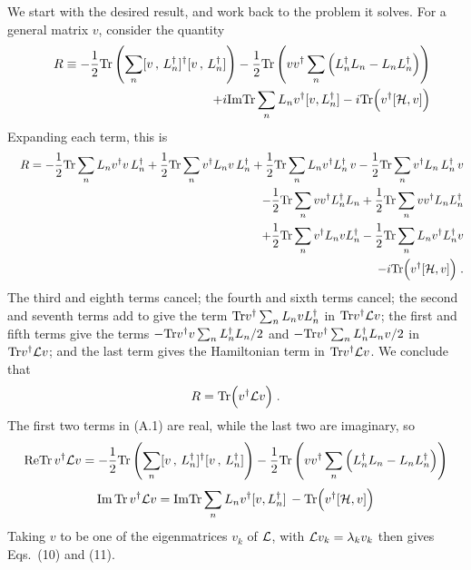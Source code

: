 \documentclass[12pt]{article}
\begin{document}
We start with the desired result, and work back to the problem it solves.  For a general matrix $v$, consider the quantity 
\begin{eqnarray}
&&R\equiv-\frac{1}{2}{\rm Tr}\left(\sum_n [v\,,\,L_n^\dagger]^\dagger[v\,,\,L_n^\dagger]\right)-\frac{1}{2}{\rm Tr}\left(v v^\dagger \sum_n\Big(L_n^\dagger L_n-L_n L_n^\dagger\Big)\right)\nonumber\\
&&+i{\rm Im}{\rm Tr}\sum_n L_nv^\dagger[v,L_n^\dagger ]-i{\rm Tr}\Big(v^\dagger [{\cal H},v]\Big)
\end{eqnarray}
Expanding each term, this is
\begin{eqnarray}
&&R=-\frac{1}{2}{\rm Tr}\sum_n L_n v^\dagger v\,L_n^\dagger
+\frac{1}{2}{\rm Tr}\sum_n  v^\dagger L_n v\,L_n^\dagger
+\frac{1}{2}{\rm Tr}\sum_n L_n v^\dagger L_n^\dagger\,v
-\frac{1}{2}{\rm Tr}\sum_n v^\dagger L_n  \,L_n^\dagger\,v\nonumber\\&&
-\frac{1}{2}{\rm Tr}\sum_n v v^\dagger  L_n^\dagger L_n
+\frac{1}{2}{\rm Tr} \sum_n v v^\dagger  L_n L^\dagger_n\nonumber\\
&&+\frac{1}{2}{\rm Tr}\sum_n v^\dagger L_n v  L_n^\dagger-\frac{1}{2}{\rm Tr}\sum_n L_n v^\dagger L_n^\dagger v\nonumber\\&&
-i{\rm Tr}\Big(v^\dagger [{\cal H},v]\Big)\;.
\end{eqnarray}
The third and eighth terms cancel; the fourth and sixth terms cancel; the second and seventh terms add to give the term
${\rm Tr} v^\dagger\sum_n L_n v L_n^\dagger$ in ${\rm Tr}v^\dagger{\cal L}v$;  the first and fifth terms give the terms
$-{\rm Tr} v^\dagger v \sum_n  L_n^\dagger L_n /2$ and $-{\rm Tr} v^\dagger\sum_n L^\dagger_n  L_n v/2$ in ${\rm Tr}v^\dagger{\cal L}v$; and the last term gives the Hamiltonian term in ${\rm Tr}v^\dagger{\cal L}v$.  We conclude that 
\begin{equation}
R={\rm Tr}\Big(v^\dagger{\cal L}v\Big)\;.
\end{equation}
The first two terms in (A.1) are real, while the last two are imaginary, so
\begin{equation}
{\rm Re}{\rm Tr}\,v^\dagger{\cal L}v=-\frac{1}{2}{\rm Tr}\left(\sum_n [v\,,\,L_n^\dagger]^\dagger[v\,,\,L_n^\dagger]\right)-\frac{1}{2}{\rm Tr}\left(v v^\dagger \sum_n\Big(L_n^\dagger L_n-L_n L_n^\dagger\Big)\right)
\end{equation}
\begin{equation}
{\rm Im}\,{\rm Tr}\,v^\dagger{\cal L}v={\rm Im}{\rm Tr}\sum_n L_nv^\dagger[v,L_n^\dagger ]\,-{\rm Tr}\Big(v^\dagger [{\cal H},v]\Big)
\end{equation}
Taking $v$ to be one of the eigenmatrices $v_k$ of ${\cal L}$, with ${\cal L}v_k=\lambda_kv_k$ then gives Eqs.~(10) and (11).
\end{document}
